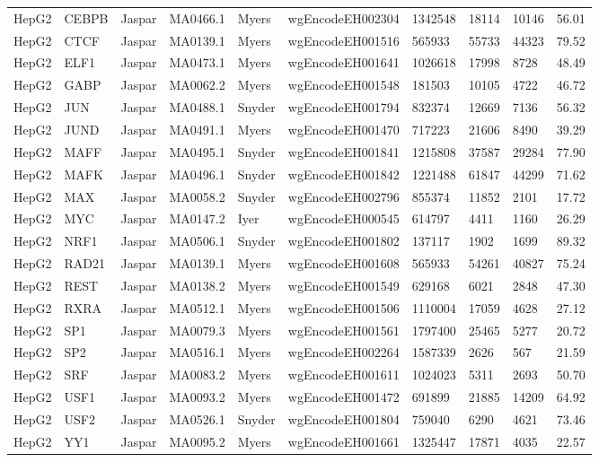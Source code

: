 {\begin{longtable}{p{1.1cm}p{1.0cm}p{1.0cm}p{1.0cm}p{1.0cm}p{2.3cm}p{1.0cm}p{0.8cm}p{0.8cm}p{0.8cm}}
HepG2 & CEBPB & Jaspar & MA0466.1 & Myers & wgEncodeEH002304 & 1342548 & 18114 & 10146 & 56.01\\
HepG2 & CTCF & Jaspar & MA0139.1 & Myers & wgEncodeEH001516 & 565933 & 55733 & 44323 & 79.52\\
HepG2 & ELF1 & Jaspar & MA0473.1 & Myers & wgEncodeEH001641 & 1026618 & 17998 & 8728 & 48.49\\
HepG2 & GABP & Jaspar & MA0062.2 & Myers & wgEncodeEH001548 & 181503 & 10105 & 4722 & 46.72\\
HepG2 & JUN & Jaspar & MA0488.1 & Snyder & wgEncodeEH001794 & 832374 & 12669 & 7136 & 56.32\\
HepG2 & JUND & Jaspar & MA0491.1 & Myers & wgEncodeEH001470 & 717223 & 21606 & 8490 & 39.29\\
HepG2 & MAFF & Jaspar & MA0495.1 & Snyder & wgEncodeEH001841 & 1215808 & 37587 & 29284 & 77.90\\
HepG2 & MAFK & Jaspar & MA0496.1 & Snyder & wgEncodeEH001842 & 1221488 & 61847 & 44299 & 71.62\\
HepG2 & MAX & Jaspar & MA0058.2 & Snyder & wgEncodeEH002796 & 855374 & 11852 & 2101 & 17.72\\
HepG2 & MYC & Jaspar & MA0147.2 & Iyer & wgEncodeEH000545 & 614797 & 4411 & 1160 & 26.29\\
HepG2 & NRF1 & Jaspar & MA0506.1 & Snyder & wgEncodeEH001802 & 137117 & 1902 & 1699 & 89.32\\
HepG2 & RAD21 & Jaspar & MA0139.1 & Myers & wgEncodeEH001608 & 565933 & 54261 & 40827 & 75.24\\
HepG2 & REST & Jaspar & MA0138.2 & Myers & wgEncodeEH001549 & 629168 & 6021 & 2848 & 47.30\\
HepG2 & RXRA & Jaspar & MA0512.1 & Myers & wgEncodeEH001506 & 1110004 & 17059 & 4628 & 27.12\\
HepG2 & SP1 & Jaspar & MA0079.3 & Myers & wgEncodeEH001561 & 1797400 & 25465 & 5277 & 20.72\\
HepG2 & SP2 & Jaspar & MA0516.1 & Myers & wgEncodeEH002264 & 1587339 & 2626 & 567 & 21.59\\
HepG2 & SRF & Jaspar & MA0083.2 & Myers & wgEncodeEH001611 & 1024023 & 5311 & 2693 & 50.70\\
HepG2 & USF1 & Jaspar & MA0093.2 & Myers & wgEncodeEH001472 & 691899 & 21885 & 14209 & 64.92\\
HepG2 & USF2 & Jaspar & MA0526.1 & Snyder & wgEncodeEH001804 & 759040 & 6290 & 4621 & 73.46\\
HepG2 & YY1 & Jaspar & MA0095.2 & Myers & wgEncodeEH001661 & 1325447 & 17871 & 4035 & 22.57\\

\end{longtable}}
